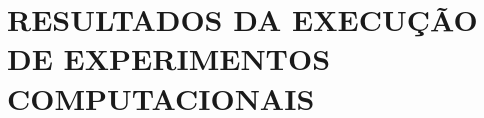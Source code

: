 \section{RESULTADOS DA EXECUÇÃO DE EXPERIMENTOS COMPUTACIONAIS}
\label{sec:resultados}

% 
% 
% 
% 
% 
% 
% 
